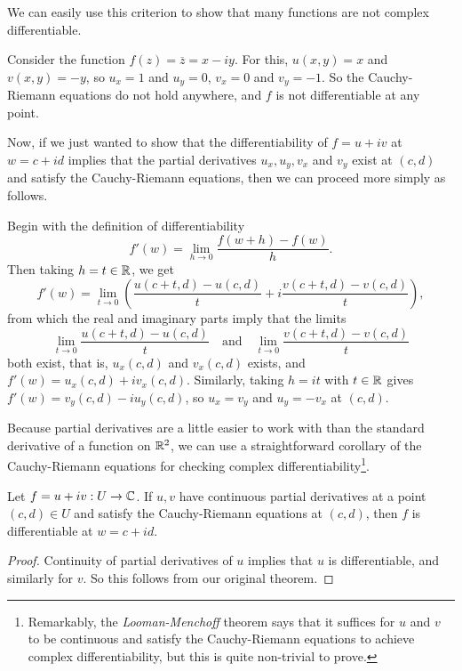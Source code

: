 \documentclass[a4paper]{scrartcl}
\begin{document}
We can easily use this criterion to show that many functions are not complex differentiable.

\begin{example}
    Consider the function $f(z) = \overline{z} = x - iy$. For this, $u(x, y) = x$ and $v(x, y) = -y$, so $u_x = 1$ and $u_y = 0$, $v_x = 0$ and $v_y = -1$. So the Cauchy-Riemann equations do not hold anywhere, and $f$ is not differentiable at any point.
\end{example}

Now, if we just wanted to show that the differentiability of $f = u + iv$ at $w = c + id$ implies that the partial derivatives $u_x, u_y, v_x$ and $v_y$ exist at $(c, d)$ and satisfy the Cauchy-Riemann equations, then we can proceed more simply as follows. 

Begin with the definition of differentiability
$$
f'(w) = \lim_{h \to 0} \frac{f(w + h) - f(w)}{h}.
$$
Then taking $h = t \in \mathbb{R}$, we get
$$
f'(w) = \lim_{t \to 0} \left(
\frac{u(c + t, d) - u(c, d)}{t} + i \frac{v(c + t, d) - v(c, d)}{t}
\right),
$$
from which the real and imaginary parts imply that the limits
$$
\lim _{t \rightarrow 0} \frac{u(c+t, d)-u(c, d)}{t} \quad \text{and} \quad \lim_{t \rightarrow 0} \frac{v(c+t, d)-v(c, d)}{t}
$$
both exist, that is, $u_x(c, d)$ and $v_x(c, d)$ exists, and $f'(w) = u_x(c, d) + i v_x(c, d)$. 
Similarly, taking $h = it$ with $t \in \mathbb{R}$ gives $f'(w) = v_y(c, d) - i u_y(c, d)$, so $u_x = v_y$ and $u_y = -v_x$ at $(c, d)$.


Because partial derivatives are a little easier to work with than the standard derivative of a function on $\mathbb{R}^2$, we can use a straightforward corollary of the Cauchy-Riemann equations for checking complex differentiability\footnote{Remarkably, the \emph{Looman-Menchoff} theorem says that it suffices for $u$ and $v$ to be continuous and satisfy the Cauchy-Riemann equations to achieve complex differentiability, but this is quite non-trivial to prove.}.

\begin{corollary}
    Let $f = u + iv: U \rightarrow \mathbb{C}$. If $u, v$ have continuous partial derivatives at a point $(c ,d) \in U$ and satisfy the Cauchy-Riemann equations at $(c, d)$, then $f$ is differentiable at $w = c + id$.
\end{corollary}
\begin{proof}
    Continuity of partial derivatives of $u$ implies that $u$ is differentiable, and similarly for $v$. So this follows from our original theorem.
\end{proof}
\end{document}
